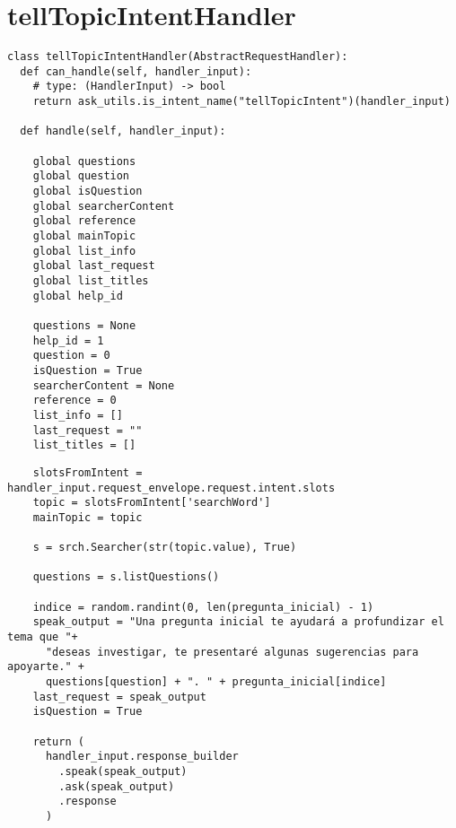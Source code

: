 
\section{tellTopicIntentHandler}
\label{A6Anexo}

\begin{tcolorbox}[colback=white!25!white,colframe=blue]
  \begin{verbatim}
class tellTopicIntentHandler(AbstractRequestHandler):
  def can_handle(self, handler_input):
    # type: (HandlerInput) -> bool
    return ask_utils.is_intent_name("tellTopicIntent")(handler_input)

  def handle(self, handler_input):
        
    global questions
    global question
    global isQuestion
    global searcherContent
    global reference
    global mainTopic
    global list_info
    global last_request
    global list_titles
    global help_id
        
    questions = None
    help_id = 1
    question = 0
    isQuestion = True
    searcherContent = None
    reference = 0
    list_info = []
    last_request = ""
    list_titles = []
  \end{verbatim}
\end{tcolorbox}

\begin{tcolorbox}[colback=white!25!white,colframe=blue]
  \begin{verbatim}    
    slotsFromIntent = handler_input.request_envelope.request.intent.slots
    topic = slotsFromIntent['searchWord']
    mainTopic = topic
    
    s = srch.Searcher(str(topic.value), True)
    
    questions = s.listQuestions()

    indice = random.randint(0, len(pregunta_inicial) - 1)
    speak_output = "Una pregunta inicial te ayudará a profundizar el tema que "+
      "deseas investigar, te presentaré algunas sugerencias para apoyarte." + 
      questions[question] + ". " + pregunta_inicial[indice]
    last_request = speak_output
    isQuestion = True

    return (
      handler_input.response_builder
        .speak(speak_output)
        .ask(speak_output)
        .response
      )
  \end{verbatim}
\end{tcolorbox}

